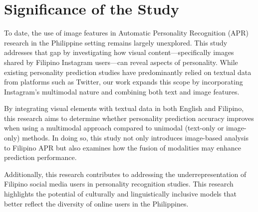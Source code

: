 


\section{Significance of the Study}
\label{sec: Significance}

To date, the use of image features in Automatic Personality Recognition (APR) research in the Philippine setting remains largely unexplored. This study addresses that gap by investigating how visual content—specifically images shared by Filipino Instagram users—can reveal aspects of personality. While existing personality prediction studies have predominantly relied on textual data from platforms such as Twitter, our work expands this scope by incorporating Instagram’s multimodal nature and combining both text and image features.

By integrating visual elements with textual data in both English and Filipino, this research aims to determine whether personality prediction accuracy improves when using a multimodal approach compared to unimodal (text-only or image-only) methods. In doing so, this study not only introduces image-based analysis to Filipino APR but also examines how the fusion of modalities may enhance prediction performance.

Additionally, this research contributes to addressing the underrepresentation of Filipino social media users in personality recognition studies. This research highlights the potential of culturally and linguistically inclusive models that better reflect the diversity of online users in the Philippines.

